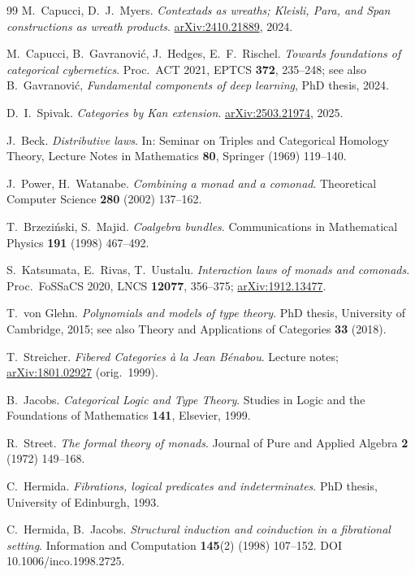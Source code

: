 \documentclass[11pt,a4paper]{book}
\theoremstyle{plain}
\theoremstyle{definition}
\theoremstyle{remark}
\begin{document}
\begin{thebibliography}{99}
 M.~Capucci, D.~J.~Myers.
\emph{Contextads as wreaths; Kleisli, Para, and Span constructions as wreath products}.
\href{https://arxiv.org/abs/2410.21889}{arXiv:2410.21889}, 2024.

 M.~Capucci, B.~Gavranovi\'c, J.~Hedges, E.~F.~Rischel.
\emph{Towards foundations of categorical cybernetics}.
Proc.\ ACT 2021, EPTCS \textbf{372}, 235--248;
see also B.~Gavranovi\'c, \emph{Fundamental components of deep learning}, PhD thesis, 2024.

 D.~I.~Spivak.
\emph{Categories by Kan extension}.
\href{https://arxiv.org/abs/2503.21974}{arXiv:2503.21974}, 2025.

 J.~Beck.
\emph{Distributive laws}.
In: Seminar on Triples and Categorical Homology Theory, Lecture Notes in Mathematics \textbf{80},
Springer (1969) 119--140.

 J.~Power, H.~Watanabe.
\emph{Combining a monad and a comonad}.
Theoretical Computer Science \textbf{280} (2002) 137--162.

 T.~Brzezi\'nski, S.~Majid.
\emph{Coalgebra bundles}.
Communications in Mathematical Physics \textbf{191} (1998) 467--492.

 S.~Katsumata, E.~Rivas, T.~Uustalu.
\emph{Interaction laws of monads and comonads}.
Proc.\ FoSSaCS 2020, LNCS \textbf{12077}, 356--375;
\href{https://arxiv.org/abs/1912.13477}{arXiv:1912.13477}.

 T.~von Glehn.
\emph{Polynomials and models of type theory}.
PhD thesis, University of Cambridge, 2015;
see also Theory and Applications of Categories \textbf{33} (2018).

 T.~Streicher.
\emph{Fibered Categories \`a la Jean B\'enabou}.
Lecture notes; \href{https://arxiv.org/abs/1801.02927}{arXiv:1801.02927} (orig.\ 1999).

 B.~Jacobs.
\emph{Categorical Logic and Type Theory}.
Studies in Logic and the Foundations of Mathematics \textbf{141}, Elsevier, 1999.

 R.~Street.
\emph{The formal theory of monads}.
Journal of Pure and Applied Algebra \textbf{2} (1972) 149--168.

 C.~Hermida.
\emph{Fibrations, logical predicates and indeterminates}.
PhD thesis, University of Edinburgh, 1993.

 C.~Hermida, B.~Jacobs.
\emph{Structural induction and coinduction in a fibrational setting}.
Information and Computation \textbf{145}(2) (1998) 107--152. DOI 10.1006/inco.1998.2725.


\end{thebibliography}
\end{document}
